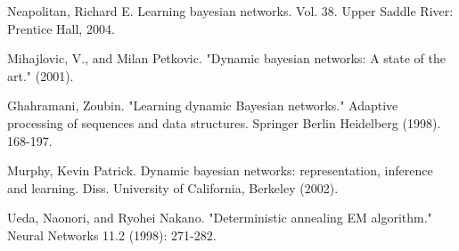 \begin{thebibliography}{99}
 {\small Neapolitan, Richard E. Learning bayesian
	networks. Vol. 38. Upper Saddle River: Prentice Hall, 2004.}

 {\small Mihajlovic, V., and Milan Petkovic.
	"Dynamic bayesian networks: A state of the art." (2001).}

 {\small Ghahramani, Zoubin. "Learning dynamic
	Bayesian networks." Adaptive processing of sequences and data structures.
	Springer Berlin Heidelberg (1998). 168-197.}

 {\small Murphy, Kevin Patrick. Dynamic bayesian
	networks: representation, inference and learning. Diss. University of
	California, Berkeley (2002).}

 {\small Ueda, Naonori, and Ryohei Nakano. "Deterministic
	annealing EM algorithm." Neural Networks 11.2 (1998): 271-282.}
\end{thebibliography}